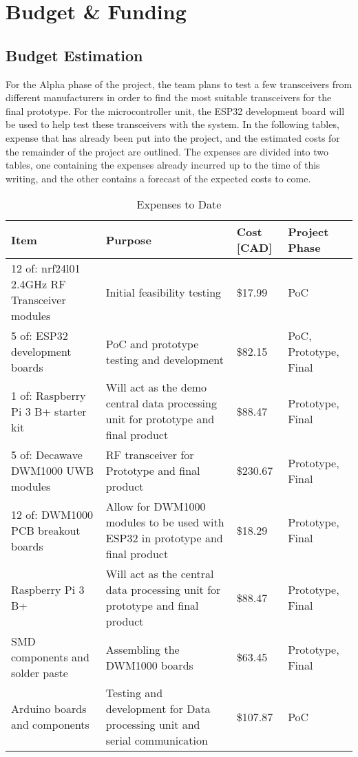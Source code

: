 
\setcounter{section}{3}
\section{Budget \& Funding}
\bigskip

\subsection{Budget Estimation}
\medskip

For the Alpha phase of the project, the team plans to test a few transceivers from different manufacturers in order to find the most suitable transceivers for the final prototype. For the microcontroller unit, the ESP32 development board will be used to help test these transceivers with the system. In the following tables, expense that has already been put into the project, and the estimated costs for the remainder of the project are outlined. The expenses are divided into two tables, one containing the expenses already incurred up to the time of this writing, and the other contains a forecast of the expected costs to come.

\begin{table}[H]
\centering
\def\arraystretch{1.3}
\begin{tabular}{ | m{4.75cm} | m{5cm} | m{2.5cm} | m{3cm} |}
\hline
\textbf{Item} & \textbf{Purpose} & \textbf{Cost [CAD]} & \textbf{Project Phase}  \\
\hline
12 of: nrf24l01 2.4GHz RF Transceiver modules & Initial feasibility testing & \$17.99 & PoC \\
\hline
5 of: ESP32 development boards & PoC and prototype testing and development & \$82.15 & PoC, Prototype, Final \\
\hline
1 of: Raspberry Pi 3 B+ starter kit & Will act as the demo central data processing unit for prototype and final product & \$88.47 & Prototype, Final \\
\hline
5 of: Decawave DWM1000 UWB modules & RF transceiver for Prototype and final product & \$230.67 & Prototype, Final \\
\hline
12 of: DWM1000 PCB breakout boards & Allow for DWM1000 modules to be used with ESP32 in prototype and final product & \$18.29 & Prototype, Final \\
\hline
Raspberry Pi 3 B+ & Will act as the central data processing unit for prototype and final product & \$88.47 & Prototype, Final \\
\hline
SMD components and solder paste & Assembling the DWM1000 boards & \$63.45 & Prototype, Final\\
\hline
Arduino boards and components & Testing and development for Data processing unit and serial communication & \$107.87 & PoC \\
\hline
\end{tabular}
\caption{Expenses to Date}
\end{table}

